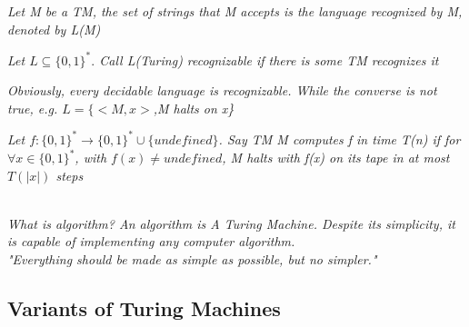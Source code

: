 \documentclass{article}
\begin{document}
\begin{defn}
    \textit{Let M be a TM, the set of strings that M accepts is the language recognized by M, denoted by L(M)}
\end{defn}

\begin{defn}
    \textit{Let $L\subseteq \{0,1\}^*.$ Call L(Turing) recognizable if there is some TM recognizes it}
\end{defn}

\begin{remark}
    \textit{Obviously, every decidable language is recognizable. While the converse is not true, e.g. $L = \{<M,x>$,M halts on x\}}
\end{remark}


\begin{defn}
    \textit{Let $f:\{0,1\}^*\rightarrow \{0,1\}^*\cup\{undefined\}$. Say TM M computes f in time T(n) if for $\forall x\in \{0,1\}^*$, with $f(x)\neq undefined$, M halts with f(x) on its tape in at most $T(|x|)$ steps}
\end{defn}

\textit{\\What is algorithm? An algorithm is A Turing Machine. Despite its simplicity, it is capable of implementing any computer algorithm.\\ "Everything should be made as simple as possible, but no simpler."}

\subsection{Variants of Turing Machines}
\end{document}
